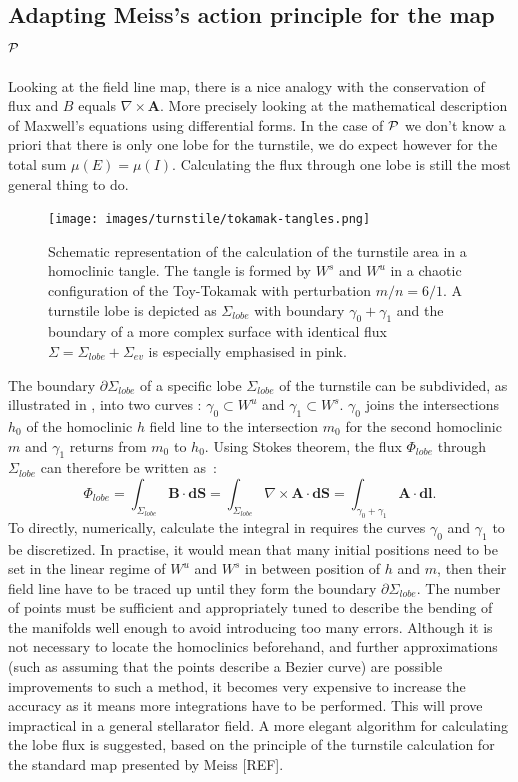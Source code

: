 \subsection{Adapting Meiss's action principle for the map $\mathcal{P}$}\label{sec:turnstile-action}
\newcommand{\Sl}{\Sigma_{lobe}}
\newcommand{\Se}{\Sigma_{ev}}

Looking at the field line map, there is a nice analogy with the conservation of flux and $B$ equals $\nabla\times\textbf{A}$. More precisely looking at the mathematical description of Maxwell's equations using differential forms. In the case of $\mathcal{P}$ we don't know a priori that there is only one lobe for the turnstile, we do expect however for the total sum $\mu(E) = \mu(I)$. Calculating the flux through one lobe is still the most general thing to do.

\begin{figure}[H]
    \centering
    \texttt{[image: images/turnstile/tokamak-tangles.png]}
    \caption{Schematic representation of the calculation of the turnstile area in a homoclinic tangle. The tangle is formed by $W^s$ and $W^u$ in a chaotic configuration of the Toy-Tokamak with perturbation $m/n = 6/1$. A turnstile lobe is depicted as $\Sl$ with boundary $\gamma_0 + \gamma_1$ and the boundary of a more complex surface with identical flux $\Sigma = \Sl + \Se$ is especially emphasised in pink.}
    \label{fig:tangle-3d}
\end{figure}

The boundary $\partial\Sl$ of a specific lobe $\Sl$ of the turnstile can be subdivided, as illustrated in , into two curves : $\gamma_0\subset W^u$ and $\gamma_1\subset W^s$. $\gamma_0$ joins the intersections $h_0$ of the homoclinic $h$ field line to the intersection $m_0$ for the second homoclinic $m$ and $\gamma_1$ returns from $m_0$ to $h_0$. Using Stokes theorem, the flux  $\Phi_{lobe}$  through $\Sl$ can therefore be written as~:
\begin{equation}\label{eq:contour-1}
    \Phi_{lobe} = \int_{\Sl} \textbf{B}\cdot\textbf{dS} = \int_{\Sl} \nabla\times\textbf{A}\cdot\textbf{dS} = \int_{\gamma_0+\gamma_1} \textbf{A}\cdot \textbf{dl}.
\end{equation}
To directly, numerically, calculate the integral in  requires the curves $\gamma_0$ and $\gamma_1$ to be discretized. In practise, it would mean that many initial positions need to be set in the linear regime of $W^u$ and $W^s$ in between position of $h$ and $m$, then their field line have to be traced up until they form the boundary $\partial\Sl$. The number of points must be sufficient and appropriately tuned to describe the bending of the manifolds well enough to avoid introducing too many errors. Although it is not necessary to locate the homoclinics beforehand, and further approximations (such as assuming that the points describe a Bezier curve) are possible improvements to such a method, it becomes very expensive to increase the accuracy as it means more integrations have to be performed. This will prove impractical in a general stellarator field. A more elegant algorithm for calculating the lobe flux is suggested, based on the principle of the turnstile calculation for the standard map presented by Meiss [REF].

